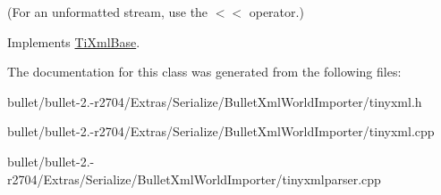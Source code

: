(For an unformatted stream, use the $<$$<$ operator.) 

Implements \hyperlink{class_ti_xml_base_a0de56b3f2ef14c65091a3b916437b512}{Ti\+Xml\+Base}.



The documentation for this class was generated from the following files\+:\begin{DoxyCompactItemize}
\item 
bullet/bullet-\/2.-\/r2704/\+Extras/\+Serialize/\+Bullet\+Xml\+World\+Importer/tinyxml.\+h\item 
bullet/bullet-\/2.-\/r2704/\+Extras/\+Serialize/\+Bullet\+Xml\+World\+Importer/tinyxml.\+cpp\item 
bullet/bullet-\/2.-\/r2704/\+Extras/\+Serialize/\+Bullet\+Xml\+World\+Importer/tinyxmlparser.\+cpp\end{DoxyCompactItemize}
